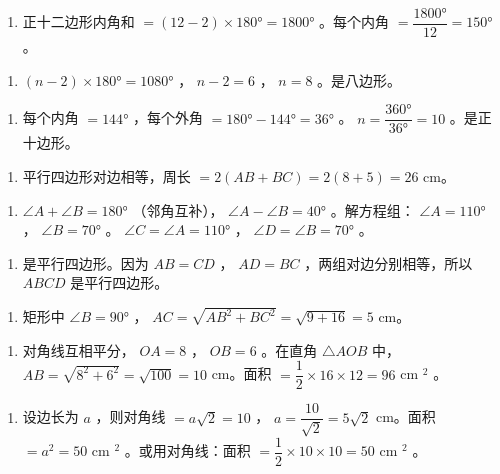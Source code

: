 \begin{answer}


\begin{enumerate}
  \item 正十二边形内角和 $= (12 - 2) \times 180° = 1800°$ 。每个内角 $= \dfrac{1800°}{12} = 150°$ 。
\end{enumerate}


\begin{enumerate}
  \item $(n - 2) \times 180° = 1080°$ ， $n - 2 = 6$ ， $n = 8$ 。是八边形。
\end{enumerate}


\begin{enumerate}
  \item 每个内角 $= 144°$ ，每个外角 $= 180° - 144° = 36°$ 。 $n = \dfrac{360°}{36°} = 10$ 。是正十边形。
\end{enumerate}


\begin{enumerate}
  \item 平行四边形对边相等，周长 $= 2(AB + BC) = 2(8 + 5) = 26$ cm。
\end{enumerate}


\begin{enumerate}
  \item $\angle A + \angle B = 180°$ （邻角互补）， $\angle A - \angle B = 40°$ 。解方程组： $\angle A = 110°$ ， $\angle B = 70°$ 。 $\angle C = \angle A = 110°$ ， $\angle D = \angle B = 70°$ 。
\end{enumerate}


\begin{enumerate}
  \item 是平行四边形。因为 $AB = CD$ ， $AD = BC$ ，两组对边分别相等，所以 $ABCD$ 是平行四边形。
\end{enumerate}


\begin{enumerate}
  \item 矩形中 $\angle B = 90°$ ， $AC = \sqrt{AB^2 + BC^2} = \sqrt{9 + 16} = 5$ cm。
\end{enumerate}


\begin{enumerate}
  \item 对角线互相平分， $OA = 8$ ， $OB = 6$ 。在直角 $\triangle AOB$ 中， $AB = \sqrt{8^2 + 6^2} = \sqrt{100} = 10$ cm。面积 $= \dfrac{1}{2} \times 16 \times 12 = 96$ cm $^2$ 。
\end{enumerate}


\begin{enumerate}
  \item 设边长为 $a$ ，则对角线 $= a\sqrt{2} = 10$ ， $a = \dfrac{10}{\sqrt{2}} = 5\sqrt{2}$ cm。面积 $= a^2 = 50$ cm $^2$ 。或用对角线：面积 $= \dfrac{1}{2} \times 10 \times 10 = 50$ cm $^2$ 。
\end{enumerate}



\end{answer}
